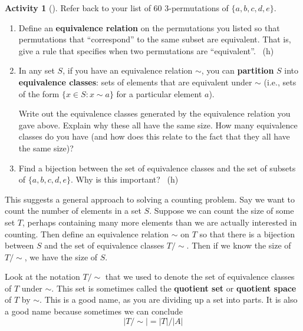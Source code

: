 \documentclass[10pt,]{book}
\newcommand{\terminology}[1]{\textbf{#1}}
\theoremstyle{plain}
\theoremstyle{definition}
\theoremstyle{definition}
\theoremstyle{definition}
\newtheorem{activity}[project]{Activity}
\numberwithin{equation}{chapter}
\def\st{:}
\begin{document}
\begin{activity}[]\label{activity-102}
\hypertarget{p-749}{}%
Refer back to your list of 60 3-permutations of \(\{a,b,c,d,e\}\).%
\begin{enumerate}[font=\bfseries,label=(\alph*),ref=\alph*]
\item\label{task-142} \hypertarget{p-750}{}%
Define an \terminology{equivalence relation} on the permutations you listed so that permutations that ``correspond'' to the same subset are equivalent.  That is, give a rule that specifies when two permutations are ``equivalent''.%
~{\tiny (h)}\item\label{task-143} \hypertarget{p-752}{}%
In any set \(S\), if you have an equivalence relation \(\sim\), you can \terminology{partition} \(S\) into \terminology{equivalence classes}: sets of elements that are equivalent under \(\sim\) (i.e., sets of the form \(\{x \in S \st x \sim a\} \) for a particular element \(a\)).%
\par
\hypertarget{p-753}{}%
Write out the equivalence classes generated by the equivalence relation you gave above.  Explain why these all have the same size.  How many equivalence classes do you have (and how does this relate to the fact that they all have the same size)?%
\item\label{task-144} \hypertarget{p-754}{}%
Find a bijection between the set of equivalence classes and the set of subsets of \(\{a,b,c,d,e\}\).  Why is this important?%
~{\tiny (h)}\end{enumerate}
\end{activity}
\hypertarget{p-756}{}%
This suggests a general approach to solving a counting problem.  Say we want to count the number of elements in a set \(S\).  Suppose we can count the size of some set \(T\), perhaps containing many more elements than we are actually interested in counting.  Then define an equivalence relation \(\sim\) on \(T\) so that there is a bijection between \(S\) and the set of equivalence classes \(T/\sim\).  Then if we know the size of \(T/\sim\), we have the size of \(S\).%
\par
\hypertarget{p-757}{}%
Look at the notation \(T/\sim\) that we used to denote the set of equivalence classes of \(T\) under \(\sim\).  This set is sometimes called the \terminology{quotient set} or \terminology{quotient space} of \(T\) by \(\sim\).  This is a good name, as you are dividing up a set into parts.  It is also a good name because sometimes we can conclude%
\begin{equation*}
|T/\sim| = |T|/|A|
\end{equation*}
\end{document}
